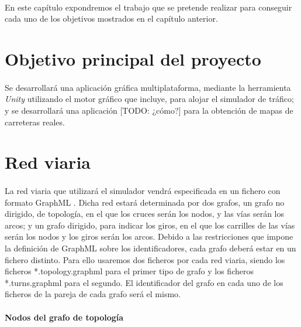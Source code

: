 	\paragraph{}
	En este capítulo expondremos el trabajo que se pretende realizar para conseguir cada uno de los objetivos mostrados en el capítulo anterior.
	
\section{Objetivo principal del proyecto}

	\paragraph{}
	Se desarrollará una aplicación gráfica multiplataforma, mediante la herramienta \emph{Unity} utilizando el motor gráfico que incluye, para alojar el simulador de tráfico; y se desarrollará una aplicación [TODO: ¿cómo?] para la obtención de mapas de carreteras reales.

\section{Red viaria}

	\paragraph{}
	La red viaria que utilizará el simulador vendrá especificada en un fichero con formato GraphML \cite{GraphML_man}. Dicha red estará determinada por dos grafos, un grafo no dirigido, de topología, en el que los cruces serán los nodos, y las vías serán los arcos; y un grafo dirigido, para indicar los giros, en el que los carrilles de las vías serán los nodos y los giros serán los arcos. Debido a las restricciones que impone la definición de GraphML sobre los identificadores, cada grafo deberá estar en un fichero distinto. Para ello usaremos dos ficheros por cada red viaria, siendo los ficheros *.topology.graphml para el primer tipo de grafo y los ficheros *.turns.graphml para el segundo. El identificador del grafo en cada uno de los ficheros de la pareja de cada grafo será el mismo.
	
	\paragraph{Nodos del grafo de topología}
	
